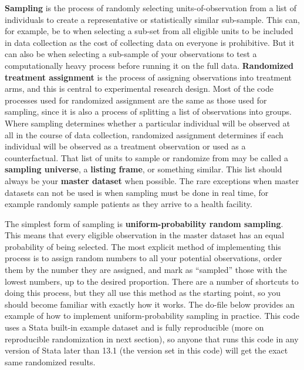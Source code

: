 \textbf{Sampling} is the process of randomly selecting units-of-observation
from a list of individuals to create a representative or statistically similar sub-sample.
This can, for example, be to when selecting a sub-set from all eligible units
to be included in data collection as the cost of collecting data on everyone is prohibitive.
But it can also be when selecting a sub-sample of your observations to test a computationally heavy process 
before running it on the full data.
\textbf{Randomized treatment assignment} is the process of assigning observations into treatment arms,
and this is central to experimental research design.
Most of the code processes used for randomized assignment are the same as those used for sampling,
since it is also a process of splitting a list of observations into groups.
Where sampling determines whether a particular individual
will be observed at all in the course of data collection,
randomized assignment determines if each individual will be observed
as a treatment observation or used as a counterfactual.
That list of units to sample or randomize from may be called a \textbf{sampling universe},
a \textbf{listing frame}, or something similar.
This list should always be your \textbf{master dataset} when possible.
The rare exceptions when master datasets can not be used is when sampling must be done in real time,
for example randomly sample patients as they arrive to a health facility.

The simplest form of sampling is 
\textbf{uniform-probability random sampling}.
This means that every eligible observation in the master dataset
has an equal probability of being selected.
The most explicit method of implementing this process
is to assign random numbers to all your potential observations,
order them by the number they are assigned,
and mark as ``sampled'' those with the lowest numbers, up to the desired proportion.
There are a number of shortcuts to doing this process,
but they all use this method as the starting point,
so you should become familiar with exactly how it works.
The do-file below provides an example of
how to implement uniform-probability sampling in practice.
This code uses a Stata built-in example dataset and is fully reproducible
(more on reproducible randomization in next section),
so anyone that runs this code in any version of Stata later than 13.1
(the version set in this code)
will get the exact same randomized results.


